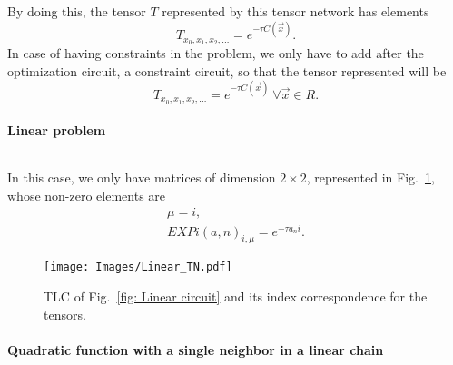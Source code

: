 By doing this, the tensor $T$ represented by this tensor network has elements
\begin{equation}
    T_{x_0,x_1,x_2,\dots} = e^{-\tau C(\vec{x})}.
\end{equation}
In case of having constraints in the problem, we only have to add after the optimization circuit, a constraint circuit, so that the tensor represented will be
\begin{equation}
    T_{x_0,x_1,x_2,\dots} = e^{-\tau C(\vec{x})} \ \forall \vec{x} \in R.
\end{equation}

\paragraph{Linear problem}
$ $

In this case, we only have matrices of dimension $2\times 2$, represented in Fig.~\ref{fig: Linear TN}, whose non-zero elements are
\begin{equation}
\begin{gathered}
    \mu=i,\\
    EXPi(a,n)_{i,\mu} = e^{-\tau a_n i}.
\end{gathered}
\end{equation}

\begin{figure}
    \centering
    \texttt{[image: Images/Linear\_TN.pdf]}
    \caption{TLC of Fig.~\ref{fig: Linear circuit} and its index correspondence for the tensors.}
    \label{fig: Linear TN}
\end{figure}


\paragraph{Quadratic function with a single neighbor in a linear chain}
$ $

